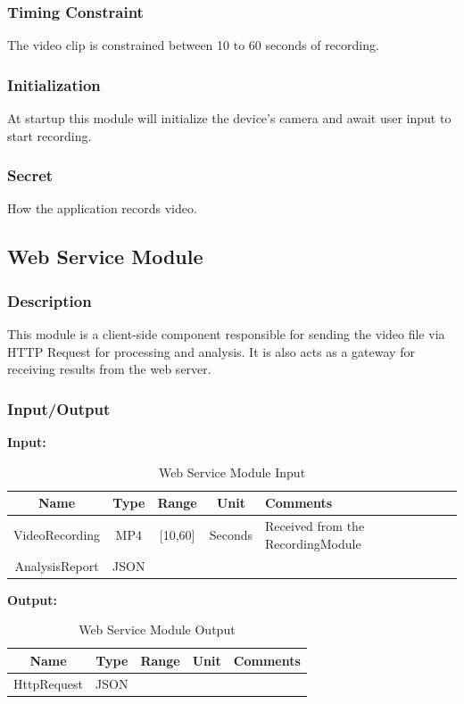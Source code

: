 \documentclass{article}
\begin{document}
\subsubsection{Timing Constraint}
The video clip is constrained between 10 to 60 seconds of recording.

\subsubsection{Initialization}
At startup this module will initialize the device’s camera and await user input to start recording.

\subsubsection{Secret}
How the application records video.

\subsection{Web Service Module}

\subsubsection{Description}
This module is a client-side component responsible for sending the video file via HTTP Request for processing and analysis. It is also acts as a gateway for receiving results from the web server.

\subsubsection{Input/Output}
\textbf{Input:}
\begin{table}[H]
    \caption{Web Service Module Input}
    \centering
    \begin{tabularx}{0.7\textwidth}{|c|c|c|c|X|} \hline
        \textbf{Name} & \textbf{Type} & \textbf{Range} & \textbf{Unit} & \textbf{Comments} \\ \hline
        VideoRecording & MP4 & [10,60] & Seconds & Received from the RecordingModule\\ \hline
        AnalysisReport & JSON & & & \\ \hline
    \end{tabularx}
    \label{tab:Web_Service_Input}
\end{table}

\textbf{Output:}
\begin{table}[H]
    \centering
    \begin{tabularx}{0.7\textwidth}{|c|c|c|c|X|} \hline
        \textbf{Name} & \textbf{Type} & \textbf{Range} & \textbf{Unit} & \textbf{Comments} \\ \hline
        HttpRequest & JSON & & &\\ \hline
    \end{tabularx}
    \caption{Web Service Module Output}
    \label{tab:Web_Service_Output}
\end{table}
\end{document}
